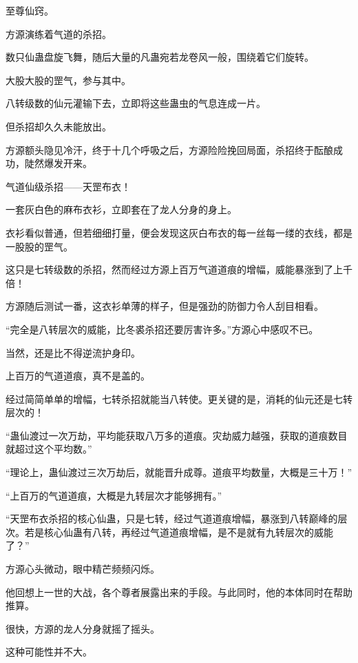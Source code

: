 
\begin{this_body}



至尊仙窍。

方源演练着气道的杀招。

数只仙蛊盘旋飞舞，随后大量的凡蛊宛若龙卷风一般，围绕着它们旋转。

大股大股的罡气，参与其中。

八转级数的仙元灌输下去，立即将这些蛊虫的气息连成一片。

但杀招却久久未能放出。

方源额头隐见冷汗，终于十几个呼吸之后，方源险险挽回局面，杀招终于酝酿成功，陡然爆发开来。

气道仙级杀招——天罡布衣！

一套灰白色的麻布衣衫，立即套在了龙人分身的身上。

衣衫看似普通，但若细细打量，便会发现这灰白布衣的每一丝每一缕的衣线，都是一股股的罡气。

这只是七转级数的杀招，然而经过方源上百万气道道痕的增幅，威能暴涨到了上千倍！

方源随后测试一番，这衣衫单薄的样子，但是强劲的防御力令人刮目相看。

“完全是八转层次的威能，比冬裘杀招还要厉害许多。”方源心中感叹不已。

当然，还是比不得逆流护身印。

上百万的气道道痕，真不是盖的。

经过简简单单的增幅，七转杀招就能当八转使。更关键的是，消耗的仙元还是七转层次的！

“蛊仙渡过一次万劫，平均能获取八万多的道痕。灾劫威力越强，获取的道痕数目就超过这个平均数。”

“理论上，蛊仙渡过三次万劫后，就能晋升成尊。道痕平均数量，大概是三十万！”

“上百万的气道道痕，大概是九转层次才能够拥有。”

“天罡布衣杀招的核心仙蛊，只是七转，经过气道道痕增幅，暴涨到八转巅峰的层次。若是核心仙蛊有八转，再经过气道道痕增幅，是不是就有九转层次的威能了？”

方源心头微动，眼中精芒频频闪烁。

他回想上一世的大战，各个尊者展露出来的手段。与此同时，他的本体同时在帮助推算。

很快，方源的龙人分身就摇了摇头。

这种可能性并不大。


\end{this_body}
